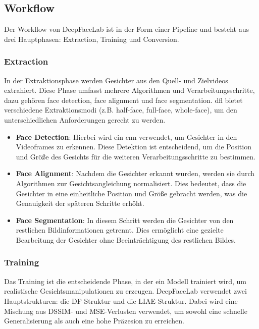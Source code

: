 \subsection{Workflow}\label{subsec:workflow}
Der Workflow von DeepFaceLab ist in der Form einer Pipeline und besteht aus drei Hauptphasen: Extraction, Training und Conversion.

\subsubsection{Extraction}
In der Extraktionsphase werden Gesichter aus den Quell- und Zielvideos extrahiert.
Diese Phase umfasst mehrere Algorithmen und Verarbeitungsschritte, dazu gehören face detection, face alignment und face segmentation.
\gls{dfl} bietet verschiedene Extraktionsmodi (z.B. half-face, full-face, whole-face), um den unterschiedlichen Anforderungen gerecht zu werden\cite{deepfacelabintegratedflexibleextensible, deepfacelab}.

\begin{itemize}
    \item \textbf{Face Detection}: Hierbei wird ein \gls{cnn} verwendet, um Gesichter in den Videoframes zu erkennen.
    Diese Detektion ist entscheidend, um die Position und Größe des Gesichts für die weiteren Verarbeitungsschritte zu bestimmen.
    \item \textbf{Face Alignment}: Nachdem die Gesichter erkannt wurden, werden sie durch Algorithmen zur Gesichtsangleichung normalisiert.
    Dies bedeutet, dass die Gesichter in eine einheitliche Position und Größe gebracht werden, was die Genauigkeit der späteren Schritte erhöht.
    \item \textbf{Face Segmentation}: In diesem Schritt werden die Gesichter von den restlichen Bildinformationen getrennt.
    Dies ermöglicht eine gezielte Bearbeitung der Gesichter ohne Beeinträchtigung des restlichen Bildes.
\end{itemize}

\subsubsection{Training}
Das Training ist die entscheidende Phase, in der ein Modell trainiert wird, um realistische Gesichtsmanipulationen zu erzeugen.
DeepFaceLab verwendet zwei Hauptstrukturen: die DF-Struktur und die LIAE-Struktur.
Dabei wird eine Mischung aus DSSIM- und MSE-Verlusten verwendet, um sowohl eine schnelle Generalisierung als auch eine hohe Präzesion zu erreichen\cite{deepfacelabintegratedflexibleextensible, deepfacelab}.

